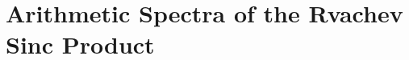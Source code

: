 \documentclass[11pt]{article}
\makeatletter
\renewcommand{\headrulewidth}{0.3pt}
\numberwithin{equation}{section}
\let\frontier@normal@H@refstepcounter\H@refstepcounter
\let\frontier@normal@Hy@chapapp\Hy@chapapp
\newcommand{\frontierreportpart}[1]{%
  \clearpage
  \let\H@refstepcounter\frontier@normal@H@refstepcounter
  \let\Hy@chapapp\frontier@normal@Hy@chapapp
  \gdef\theHsection{\arabic{part}.\arabic{section}}%
  \setcounter{section}{0}%
  \renewcommand{\thesection}{\arabic{section}}%
  \part{#1}}
\theoremstyle{definition}
\theoremstyle{remark}
\makeatother
\begin{document}
\renewcommand{\headrulewidth}{0.4pt}
\newcommand{\sgnPartx}{\operatorname{sgn}}
\newcommand{\ord}{\operatorname{ord}}
\newcommand{\Res}{\operatorname*{Res}}
\newcommand{\suppPartx}{\operatorname{supp}}
\newcommand{\VarPartx}{\operatorname{Var}}
\newcommand{\bigO}{\mathcal O}
\newcommand{\smallo}{o}
\newcommand{\wt}{s_2}
\newcommand{\vtwo}{\nu_2}
\newcommand{\vb}{\nu_b}
\newcommand{\absPartx}[1]{\left\lvert #1\right\rvert}
\newcommand{\Corpus}{\textsc{Corpus}}
\newcommand{\Derived}{\textsc{Derived}}
\newcommand{\NewResult}{\textsc{New-to-snapshot}}
\newcommand{\Observed}{\textsc{Prior observation}}
\newcommand{\OpenStatus}{\textsc{Open}}
\newcommand{\repo}{\nolinkurl{Analysis/FabiusFunction/docs}}
\newcommand{\commit}{\nolinkurl{0b1db2f91321b6575be9a712dc1025e88af318db}}
\newtheorem{conjecture}[theorem]{Conjecture}
\newcommand{\frontierproblemname}{Open problem}
\newtheorem{problem}[theorem]{\frontierproblemname}
\newenvironment{proofidea}
  {\par\smallskip\noindent\textit{Proof architecture.}\ }
  {\hfill$\square$\par\smallskip}
\newenvironment{boxedremark}{%
  \par\medskip\noindent\begin{center}\begin{minipage}{0.94\textwidth}%
  \color{deepgray}\hrule\vspace{0.65em}\small
}{%
  \vspace{0.65em}\hrule\end{minipage}\end{center}\medskip
}

\frontierreportpart{Arithmetic Spectra of the Rvachev Sinc Product}
\end{document}
